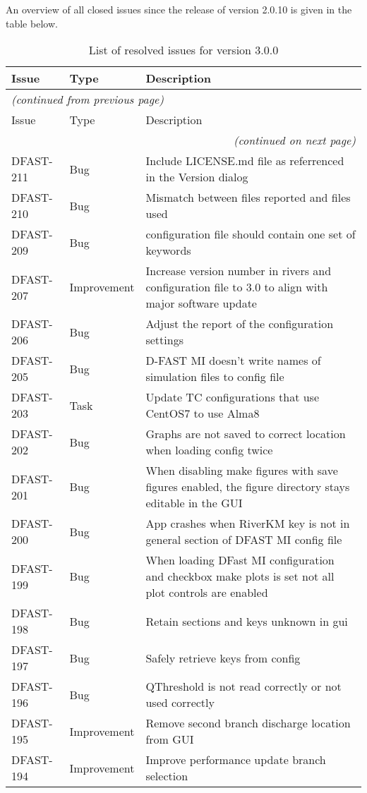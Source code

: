 \documentclass[git]{deltares_manual}
\begin{document}
An overview of all closed issues since the release of version 2.0.10 is given in the table below.

\begin{longtable}{l|l|p{8cm}}
\caption{List of resolved issues for version 3.0.0} \\
Issue & Type & Description \\ \hline
\endfirsthead
\multicolumn{3}{l}{\textsl{(continued from previous page)}} \\
Issue & Type & Description \\ \hline
\endhead
\hline \multicolumn{3}{r}{\textsl{(continued on next page)}} \\
\endfoot
\endlastfoot 
DFAST-211 & Bug & Include LICENSE.md file as referrenced in the Version dialog \\
DFAST-210 & Bug & Mismatch between files reported and files used \\
DFAST-209 & Bug & configuration file should contain one set of keywords \\
DFAST-207 & Improvement & Increase version number in rivers and configuration file to 3.0 to align with major software update \\
DFAST-206 & Bug & Adjust the report of the configuration settings \\
DFAST-205 & Bug & D-FAST MI doesn't write names of simulation files to config file \\
DFAST-203 & Task & Update TC configurations that use CentOS7 to use Alma8 \\
DFAST-202 & Bug & Graphs are not saved to correct location when loading config twice \\
DFAST-201 & Bug & When disabling make figures with save figures enabled, the figure directory stays editable in the GUI \\
DFAST-200 & Bug & App crashes when RiverKM key is not in general section of DFAST MI config file \\
DFAST-199 & Bug & When loading DFast MI configuration and checkbox make plots is set not all plot controls are enabled \\
DFAST-198 & Bug & Retain sections and keys unknown in gui \\
DFAST-197 & Bug & Safely retrieve keys from config \\
DFAST-196 & Bug & QThreshold is not read correctly or not used correctly \\
DFAST-195 & Improvement & Remove second branch discharge location from GUI \\
DFAST-194 & Improvement & Improve performance update branch selection \\

\end{longtable}
\end{document}
